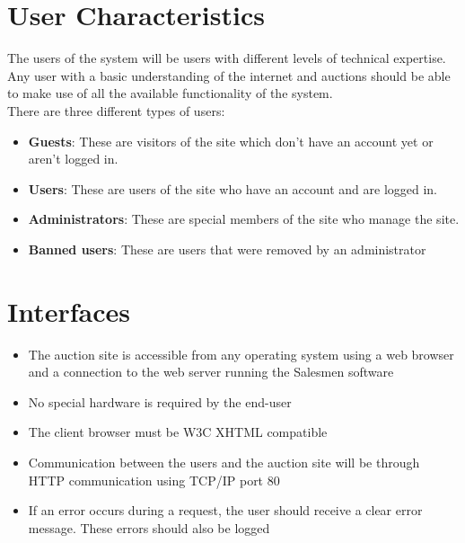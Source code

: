 \section{User Characteristics}
	The users of the system will be users with different levels of 
	technical expertise. Any user with a basic understanding of the 
	internet and auctions should be able to make use of all the 
	available functionality of the system.\\
	There are three different types of users:
	\begin{itemize}
		\item \textbf{Guests}: These are visitors of the site which don't 
		have an account yet or aren't logged in.
		\item \textbf{Users}: These are users of the site who have an 
		account and are logged in.
		\item \textbf{Administrators}: These are special members of the 
		site who manage the site.
		\item \textbf{Banned users}: These are users that were removed by
		an administrator
	\end{itemize}
\section{Interfaces}

	\begin{itemize}
		\item The auction site is accessible from any operating system using 
			a web browser and a connection to the web server running the
			Salesmen software
		\item No special hardware is required by the end-user
		\item The client browser must be W3C XHTML compatible
		\item Communication between the users and the auction site will be
			through HTTP communication using TCP/IP port 80
		\item If an error occurs during a request, the user should receive 
			a clear error message. These errors should also be logged			
	\end{itemize}
	
